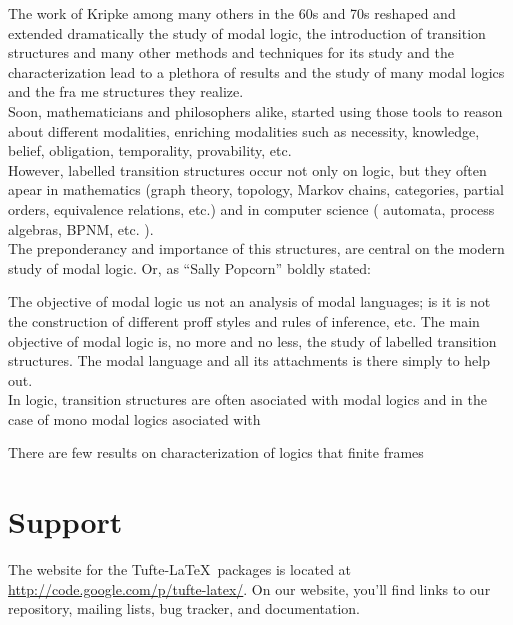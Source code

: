 \documentclass{tufte-handout}
\begin{document}
The work of Kripke among many others in the 60s and 70s reshaped and extended dramatically the study of modal logic, the introduction of transition structures and many other methods and techniques for its study and the characterization lead to a plethora of results and the study of many modal logics and the fra me structures they realize.\\

Soon, mathematicians and philosophers alike, started using those tools to reason about different modalities, enriching modalities such as necessity, knowledge, belief, obligation, temporality, provability, etc.\\

However, labelled transition structures occur not only on logic, but they often apear in mathematics (graph theory, topology, Markov chains, categories,  partial orders, equivalence relations, etc.) and in computer science ( automata, process algebras, BPNM,  etc. ).\\

The preponderancy and importance of this structures, are central on the modern study of modal  logic. Or, as ``Sally Popcorn'' boldly stated:

The objective of modal logic us not an analysis of modal languages; is it is not the construction of different proff styles and rules of inference, etc. The main objective of modal logic is, no more and no less, the study of labelled transition structures. The modal language and all its attachments is there simply to help out.\\



In logic, transition structures are often asociated with modal logics and in the case of mono modal logics asociated with

There are few results on characterization of logics that finite frames



\section{Support}\label{sec:support}

The website for the Tufte-\LaTeX\ packages is located at
\url{http://code.google.com/p/tufte-latex/}.  On our website, you'll find
links to our  repository, mailing lists, bug tracker, and documentation.



\end{document}
